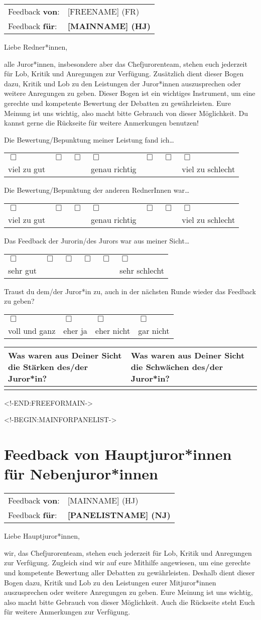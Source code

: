 \documentclass{scrartcl}
\newcommand{\questionsix}[3]{%
#3%

\medskip%

{%
  \centering%
  \begin{tabular}{>{\centering}p{0.13\textwidth}%
                  >{\centering}p{0.13\textwidth}%
                  >{\centering}p{0.13\textwidth}%
                  >{\centering}p{0.13\textwidth}%
                  >{\centering}p{0.13\textwidth}%
                  >{\centering\arraybackslash}p{0.13\textwidth}}%
    $\Box$ & $\Box$ & $\Box$ & $\Box$ & $\Box$ & $\Box$ \\%
    #1 & & & & & #2%
  \end{tabular}%
}%
}
\newcommand{\questionseven}[4]{%
#4%

\medskip%

{%
  \centering%
  \begin{tabular}{>{\centering}p{0.11\textwidth}%
                  >{\centering}p{0.11\textwidth}%
                  >{\centering}p{0.11\textwidth}%
                  >{\centering}p{0.11\textwidth}%
                  >{\centering}p{0.11\textwidth}%
                  >{\centering}p{0.11\textwidth}%
                  >{\centering\arraybackslash}p{0.11\textwidth}}%
    $\Box$ & $\Box$ & $\Box$ & $\Box$ & $\Box$ & $\Box$ & $\Box$ \\%
    #1 & & & #2 & & & #3%
  \end{tabular}%
}%
}
\newcommand{\questionfour}[1]{%
#1%

\medskip%

{%
  \centering%
  \begin{tabular}{>{\centering}p{0.23\textwidth}%
                  >{\centering}p{0.23\textwidth}%
                  >{\centering}p{0.23\textwidth}%
                  >{\centering\arraybackslash}p{0.23\textwidth}}%
    $\Box$ & $\Box$ & $\Box$ & $\Box$ \\%
    voll und ganz & eher ja & eher nicht & gar nicht %
  \end{tabular}%
}%
}
\newcommand{\strengthsandweaknesses}[1]{%
{%
  \centering%
  \begin{tabular}{|p{0.45\textwidth}|p{0.45\textwidth}|}%
    \hline%
    Was waren aus Deiner Sicht die Stärken des/der Juror*in? &%
    Was waren aus Deiner Sicht die Schwächen des/der Juror*in? \\%
    \hline%
    \bigskip & \\[#1]%
    \hline%
  \end{tabular}%
}%
}
\newcommand{\feedbackfromfor}[2]{%
\begin{tabular}{ll}%
  Feedback \textbf{von}: & #1 \\%
  Feedback \textbf{für}: & \textbf{#2}%
\end{tabular}%
}
\begin{document}
    \feedbackfromfor{[FREENAME] (FR)}{[MAINNAME] (HJ)}

    \bigskip

    Liebe Redner*innen,

    \medskip

    alle Juror*innen, insbesondere aber das Chefjurorenteam, stehen euch
    jederzeit für Lob, Kritik und Anregungen zur Verfügung. Zusätzlich dient
    dieser Bogen dazu, Kritik und Lob zu den Leistungen der Juror*innen
    auszusprechen oder weitere Anregungen zu geben. Dieser Bogen ist ein
    wichtiges Instrument, um eine gerechte und kompetente Bewertung der
    Debatten zu gewährleisten. Eure Meinung ist uns wichtig, also macht bitte
    Gebrauch von dieser Möglichkeit. Du kannst gerne die Rückseite für weitere
    Anmerkungen benutzen!

    \medskip
    \hrulefill
    \medskip

    \questionseven{viel zu gut}{genau richtig}{viel zu schlecht}{
      Die Bewertung/Bepunktung meiner Leistung fand ich\dots
    }
    \medskip

    \questionseven{viel zu gut}{genau richtig}{viel zu schlecht}{
      Die Bewertung/Bepunktung der anderen RednerInnen war\dots
    }
    \medskip

    \questionsix{sehr gut}{sehr schlecht}{
      Das Feedback der Jurorin/des Jurors war aus meiner Sicht\dots
    }
    \medskip

    \questionfour{
      Traust du dem/der Juror*in zu, auch in der nächsten Runde wieder das
      Feedback zu geben?
    }
    \medskip

    \strengthsandweaknesses{6cm}

    \newpage
  <!-END:FREEFORMAIN->

  <!-BEGIN:MAINFORPANELIST->
    \section*{Feedback von Hauptjuror*innen für Nebenjuror*innen}

    \feedbackfromfor{[MAINNAME] (HJ)}{[PANELISTNAME] (NJ)}

    \bigskip

    Liebe Hauptjuror*innen,

    \medskip

    wir, das Chefjurorenteam, stehen euch jederzeit für
    Lob, Kritik und Anregungen zur Verfügung. Zugleich sind wir auf eure
    Mithilfe angewiesen, um eine gerechte und kompetente Bewertung aller
    Debatten zu gewährleisten. Deshalb dient dieser Bogen dazu, Kritik und Lob
    zu den Leistungen eurer Mitjuror*innen auszusprechen oder weitere
    Anregungen zu geben. Eure Meinung ist uns wichtig, also macht bitte
    Gebrauch von dieser Möglichkeit. Auch die Rückseite steht Euch für weitere
    Anmerkungen zur Verfügung.
\end{document}
